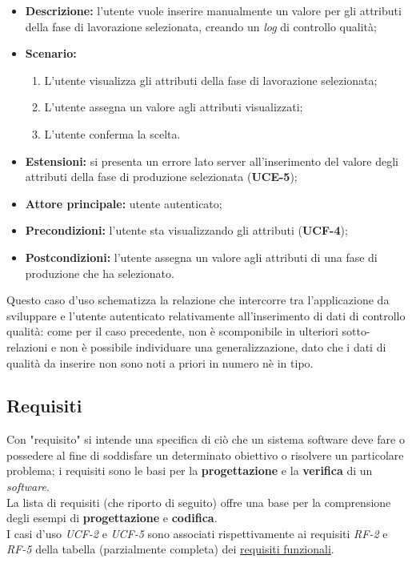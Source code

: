         \begin{itemize}
            \item \textbf{Descrizione:} l’utente vuole inserire manualmente un valore per gli attributi della fase di lavorazione selezionata, creando un \textit{log} di controllo qualità;
            \item \textbf{Scenario:}
                \begin{enumerate}
                    \item L’utente visualizza gli attributi della fase di lavorazione selezionata;
                    \item L'utente assegna un valore agli attributi visualizzati;
                    \item L'utente conferma la scelta.
                \end{enumerate}
            \item \textbf{Estensioni:} si presenta un errore lato server all’inserimento del valore degli attributi della fase di produzione selezionata (\textbf{UCE-5});
            \item \textbf{Attore principale:} utente autenticato;
            \item \textbf{Precondizioni:} l’utente sta visualizzando gli attributi (\textbf{UCF-4});
            \item \textbf{Postcondizioni:} l’utente assegna un valore agli attributi di una fase di produzione che ha selezionato.
        \end{itemize}

        Questo caso d'uso schematizza la relazione che intercorre tra l'applicazione da sviluppare e l'utente autenticato relativamente all'inserimento di dati di controllo qualità: come per il caso precedente, non è scomponibile in ulteriori sotto-relazioni e non è 
        possibile individuare una generalizzazione, dato che i dati di qualità da inserire non sono noti a priori in numero nè in tipo.

\subsection{Requisiti}
\label{subsec:requisiti}

Con "requisito" si intende una specifica di ciò che un sistema software deve fare o possedere al fine di soddisfare un determinato obiettivo o risolvere un particolare problema; i requisiti sono le basi per la \textbf{progettazione} e la \textbf{verifica} di un \textit{software}. \\
La lista di requisiti (che riporto di seguito) offre una base per la comprensione degli esempi di \textbf{progettazione} e \textbf{codifica}. \\
I casi d'uso \textit{UCF-2} e \textit{UCF-5} sono associati rispettivamente ai requisiti \textit{RF-2} e \textit{RF-5} della tabella (parzialmente completa) dei \hyperref[tab:requisiti-funzionali]{requisiti funzionali}.
